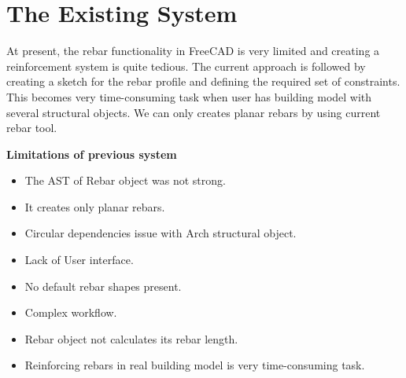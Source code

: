 \section{The Existing System}
At present, the rebar functionality in FreeCAD is very limited and creating a reinforcement system is quite tedious. The current approach is followed by creating a sketch for the rebar profile and defining the required set of constraints. This becomes very time-consuming task when user has building model with several structural objects. We can only creates planar rebars by using current rebar tool. 

{\bf {Limitations of previous system }}
\begin{itemize}
	
	\item The AST of Rebar object was not strong.
	
	\item It creates only planar rebars.
	
	\item Circular dependencies issue with Arch structural object.
	
	\item Lack of User interface.
	
	\item No default rebar shapes present.
	
	\item Complex workflow.
	
	\item Rebar object not calculates its rebar length.

    \item Reinforcing rebars in real building model is very time-consuming task.
	
\end{itemize}
